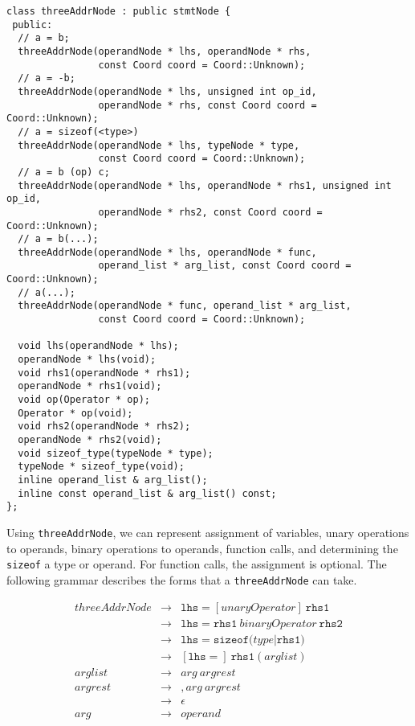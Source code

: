 \begin{small}
\begin{verbatim}
class threeAddrNode : public stmtNode {
 public:
  // a = b;
  threeAddrNode(operandNode * lhs, operandNode * rhs, 
                const Coord coord = Coord::Unknown);
  // a = -b;
  threeAddrNode(operandNode * lhs, unsigned int op_id, 
                operandNode * rhs, const Coord coord = Coord::Unknown);
  // a = sizeof(<type>)
  threeAddrNode(operandNode * lhs, typeNode * type,
                const Coord coord = Coord::Unknown);
  // a = b (op) c;
  threeAddrNode(operandNode * lhs, operandNode * rhs1, unsigned int op_id,
                operandNode * rhs2, const Coord coord = Coord::Unknown);
  // a = b(...);
  threeAddrNode(operandNode * lhs, operandNode * func, 
                operand_list * arg_list, const Coord coord = Coord::Unknown);
  // a(...);
  threeAddrNode(operandNode * func, operand_list * arg_list, 
                const Coord coord = Coord::Unknown);

  void lhs(operandNode * lhs);
  operandNode * lhs(void);
  void rhs1(operandNode * rhs1);
  operandNode * rhs1(void);
  void op(Operator * op);
  Operator * op(void);
  void rhs2(operandNode * rhs2);
  operandNode * rhs2(void);
  void sizeof_type(typeNode * type);
  typeNode * sizeof_type(void);
  inline operand_list & arg_list();
  inline const operand_list & arg_list() const;
};
\end{verbatim}
\end{small}

Using \texttt{threeAddrNode}, we can represent assignment of variables, unary
operations to operands, binary operations to operands, function calls, and
determining the \texttt{sizeof} a type or operand.  For function calls, the
assignment is optional.  The following grammar describes the forms that
a \texttt{threeAddrNode} can take.

\begin{eqnarray*}
threeAddrNode & \rightarrow & \texttt{lhs} = [unaryOperator]\ \texttt{rhs1} \\
              & \rightarrow & \texttt{lhs} = \texttt{rhs1}\ binaryOperator\ 
					     \texttt{rhs2} \\
              & \rightarrow & \texttt{lhs} = \texttt{sizeof(} type | 
						\texttt{rhs1} \texttt{)} \\
              & \rightarrow & [\texttt{lhs} =]\ \texttt{rhs1}(arglist) \\
arglist & \rightarrow & arg\ argrest \\
argrest & \rightarrow & , arg\ argrest \\
        & \rightarrow & \epsilon\\
arg     & \rightarrow & operand
\end{eqnarray*}

